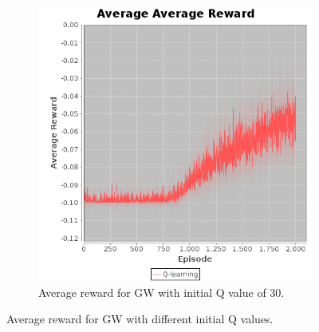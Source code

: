 \documentclass[10pt, twocolumn]{article}
\begin{document}
\begin{figure}[]
\begin{subfigure}[t]{0.24\textwidth}
					\includegraphics[width=\textwidth]{../graphics/GridWorld_30_Q_rewards.png}
					\caption{Average reward for GW with initial Q value of 30.}
					\label{fig:GW:qintit2}
				\end{subfigure}
				\caption{Average reward for GW with different initial Q values.}
				\label{fig:GW:aqinit}
			\end{figure}
\end{document}
